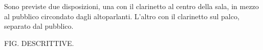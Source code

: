 Sono previste due disposizioni, una con il clarinetto al centro della sala, in mezzo al pubblico circondato dagli altoparlanti. L'altro con il clarinetto sul palco, separato dal pubblico.

FIG. DESCRITTIVE.

%
%
%
%
%
